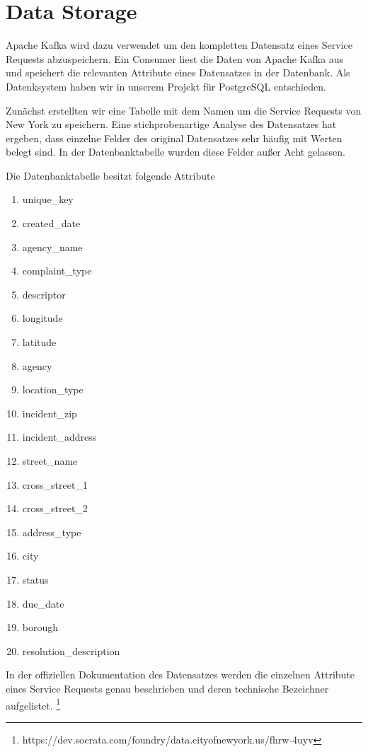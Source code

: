 \section{Data Storage}
Apache Kafka wird dazu verwendet um den kompletten Datensatz eines Service Requests abzuspeichern.
Ein Consumer liest die Daten von Apache Kafka aus und speichert die relevanten Attribute eines Datensatzes in der Datenbank.
Als Datenksystem haben wir in unserem Projekt für PostgreSQL entschieden.

Zunächst erstellten wir eine Tabelle mit dem Namen  um die Service Requests von New York zu speichern.
Eine stichprobenartige Analyse des Datensatzes hat ergeben, dass einzelne Felder des original Datensatzes sehr häufig mit 
Werten belegt sind.
In der Datenbanktabelle  wurden diese Felder außer Acht gelassen.

Die Datenbanktabelle besitzt folgende Attribute
\begin{enumerate}
  \item unique_key
  \item created_date
  \item agency_name
  \item complaint_type
  \item descriptor
  \item longitude
  \item latitude
  \item agency
  \item location_type
  \item incident_zip
  \item incident_address
  \item street_name
  \item cross_street_1
  \item cross_street_2
  \item address_type
  \item city
  \item status
  \item due_date
  \item borough
  \item resolution_description
\end{enumerate}

In der offiziellen Dokumentation des Datensatzes werden die einzelnen Attribute
eines Service Requests genau beschrieben und deren technische Bezeichner aufgelistet.
\footnote{https://dev.socrata.com/foundry/data.cityofnewyork.us/fhrw-4uyv}

